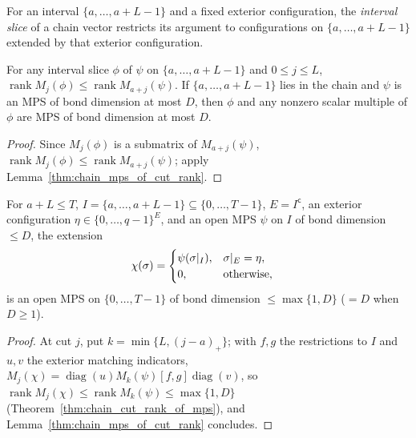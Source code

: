 \begin{definition}
    \label{def:chain_interval_slice}
    \leanok
    For an interval $\{a,\dots,a+L-1\}$ and a fixed exterior configuration, the
    \emph{interval slice} of a chain vector restricts its argument to
    configurations on $\{a,\dots,a+L-1\}$ extended by that exterior
    configuration.
\end{definition}

\begin{lemma}
    \label{thm:chain_interval_slice_mps}
    \leanok
    For any interval slice $\phi$ of $\psi$ on $\{a,\dots,a+L-1\}$ and
    $0\le j\le L$, $\operatorname{rank}M_j(\phi)\le\operatorname{rank}M_{a+j}(\psi)$.
    If $\{a,\dots,a+L-1\}$ lies in the chain and $\psi$ is an MPS of bond
    dimension at most $D$, then $\phi$ and any nonzero scalar multiple of $\phi$
    are MPS of bond dimension at most $D$.
\end{lemma}
\begin{proof}\leanok
    Since $M_j(\phi)$ is a submatrix of $M_{a+j}(\psi)$,
    $\operatorname{rank}M_j(\phi)\le\operatorname{rank}M_{a+j}(\psi)$; apply
    Lemma~\ref{thm:chain_mps_of_cut_rank}.
\end{proof}

\begin{lemma}
    \label{thm:chain_fixed_configuration_extension}
    \leanok
    For $a+L\leq T$, $I=\{a,\ldots,a+L-1\}\subseteq\{0,\ldots,T-1\}$,
    $E=I^{\mathsf c}$, an exterior configuration $\eta\in\{0,\ldots,q-1\}^E$,
    and an open MPS $\psi$ on $I$ of bond dimension $\le D$, the extension
    \begin{align}
        \chi(\sigma) & =
        \begin{cases}
            \psi(\sigma|_I), & \sigma|_E=\eta,   \\
            0,               & \text{otherwise},
        \end{cases}
        \notag
    \end{align}
    is an open MPS on $\{0,\ldots,T-1\}$ of bond dimension $\le\max\{1,D\}$
    ($=D$ when $D\geq1$).
\end{lemma}
\begin{proof}\leanok
    At cut $j$, put $k=\min\{L,(j-a)_+\}$; with $f,g$ the restrictions to $I$
    and $u,v$ the exterior matching indicators,
    $M_j(\chi)=\operatorname{diag}(u)M_k(\psi)[f,g]\operatorname{diag}(v)$, so
    $\operatorname{rank}M_j(\chi)\le\operatorname{rank}M_k(\psi)\le\max\{1,D\}$
    (Theorem~\ref{thm:chain_cut_rank_of_mps}), and
    Lemma~\ref{thm:chain_mps_of_cut_rank} concludes.
\end{proof}

